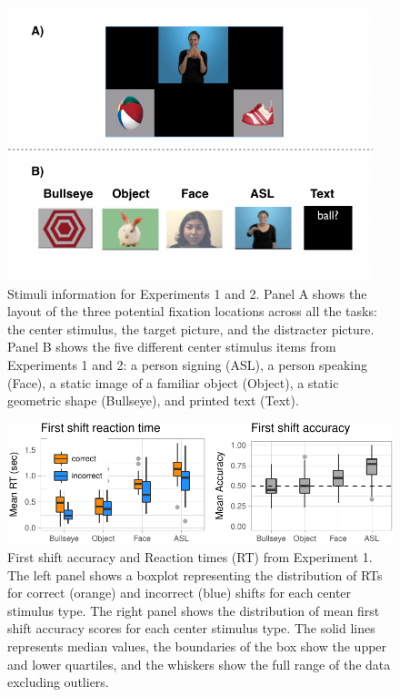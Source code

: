 \documentclass[10pt, letterpaper]{article}
\newenvironment{CodeChunk}{}{}
\begin{document}
\begin{CodeChunk}
\begin{figure}[t]

{\centering \includegraphics{figs/e1_stimuli-1} 

}

\caption[Stimuli information for Experiments 1 and 2]{Stimuli information for Experiments 1 and 2. Panel A shows the layout of the three potential fixation locations across all the tasks: the center stimulus, the target picture, and the distracter picture. Panel B shows the five different center stimulus items from Experiments 1 and 2: a person signing (ASL), a person speaking (Face), a static image of a familiar object (Object), a static geometric shape (Bullseye), and printed text (Text).}\label{fig:e1_stimuli}
\end{figure}
\end{CodeChunk}

\begin{CodeChunk}
\begin{figure}[t]

{\centering \includegraphics{figs/e1_acc_rt_plot-1} 

}

\caption[First shift accuracy and Reaction times (RT) from Experiment 1]{First shift accuracy and Reaction times (RT) from Experiment 1. The left panel shows a boxplot representing the distribution of RTs for correct (orange) and incorrect (blue) shifts for each center stimulus type. The right panel shows the distribution of mean first shift accuracy scores for each center stimulus type. The solid lines represents median values, the boundaries of the box show the upper and lower quartiles, and the whiskers show the full range of the data excluding outliers.}\label{fig:e1_acc_rt_plot}
\end{figure}
\end{CodeChunk}
\end{document}
